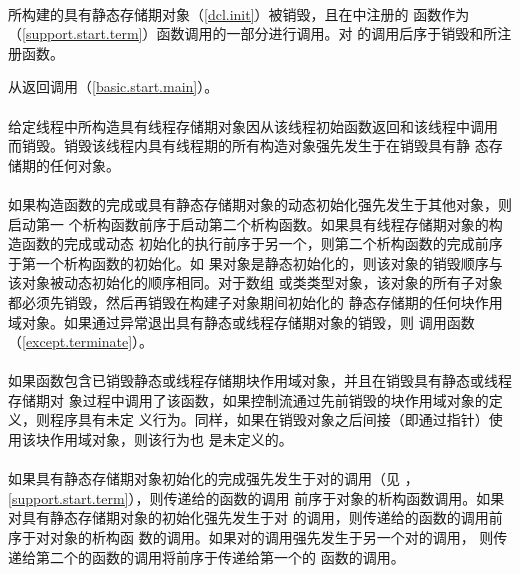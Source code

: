 \paragraph{} %
所构建的具有静态存储期对象（\ref{dcl.init}）被销毁，且在中注册的
函数作为（\ref{support.start.term}）函数调用的一部分进行调用。对
的调用后序于销毁和所注册函数。

\begin{note}
  从返回调用（\ref{basic.start.main}）。
\end{note}

\paragraph{} %
给定线程中所构造具有线程存储期对象因从该线程初始函数返回和该线程中调用
而销毁。销毁该线程内具有线程期的所有构造对象强先发生于在销毁具有静
态存储期的任何对象。

\paragraph{} %
如果构造函数的完成或具有静态存储期对象的动态初始化强先发生于其他对象，则启动第一
个析构函数前序于启动第二个析构函数。如果具有线程存储期对象的构造函数的完成或动态
初始化的执行前序于另一个，则第二个析构函数的完成前序于第一个析构函数的初始化。如
果对象是静态初始化的，则该对象的销毁顺序与该对象被动态初始化的顺序相同。对于数组
或类类型对象，该对象的所有子对象都必须先销毁，然后再销毁在构建子对象期间初始化的
静态存储期的任何块作用域对象。如果通过异常退出具有静态或线程存储期对象的销毁，则
调用函数（\ref{except.terminate}）。

\paragraph{} %
如果函数包含已销毁静态或线程存储期块作用域对象，并且在销毁具有静态或线程存储期对
象过程中调用了该函数，如果控制流通过先前销毁的块作用域对象的定义，则程序具有未定
义行为。同样，如果在销毁对象之后间接（即通过指针）使用该块作用域对象，则该行为也
是未定义的。

\paragraph{} %
如果具有静态存储期对象初始化的完成强先发生于对的调用（见
，\ref{support.start.term}），则传递给的函数的调用
前序于对象的析构函数调用。如果对具有静态存储期对象的初始化强先发生于对
的调用，则传递给的函数的调用前序于对对象的析构函
数的调用。如果对的调用强先发生于另一个对的调用，
则传递给第二个的函数的调用将前序于传递给第一个的
函数的调用。

